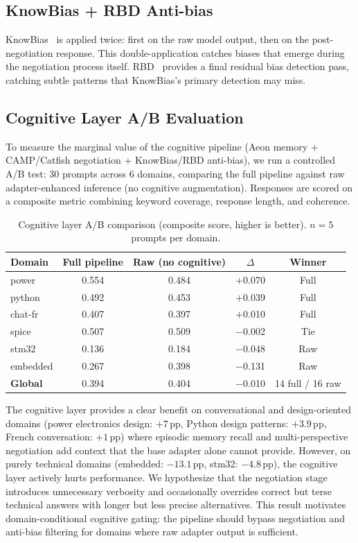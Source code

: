 \documentclass[11pt,a4paper]{article}
\begin{document}
\subsection{KnowBias + RBD Anti-bias}

KnowBias~\citep{knowbias2025} is applied twice: first on the raw model output, then on the post-negotiation response. This double-application catches biases that emerge during the negotiation process itself. RBD~\citep{rbd2025} provides a final residual bias detection pass, catching subtle patterns that KnowBias's primary detection may miss.

\subsection{Cognitive Layer A/B Evaluation}

To measure the marginal value of the cognitive pipeline (Aeon memory + CAMP/Catfish negotiation + KnowBias/RBD anti-bias), we run a controlled A/B test: 30 prompts across 6 domains, comparing the full pipeline against raw adapter-enhanced inference (no cognitive augmentation). Responses are scored on a composite metric combining keyword coverage, response length, and coherence.

\begin{table}[h]
\centering
\caption{Cognitive layer A/B comparison (composite score, higher is better). $n{=}5$ prompts per domain.}
\label{tab:cognitive-ab}
\begin{tabular}{lcccc}
\toprule
\textbf{Domain} & \textbf{Full pipeline} & \textbf{Raw (no cognitive)} & \textbf{$\Delta$} & \textbf{Winner} \\
\midrule
power & 0.554 & 0.484 & $+$0.070 & Full \\
python & 0.492 & 0.453 & $+$0.039 & Full \\
chat-fr & 0.407 & 0.397 & $+$0.010 & Full \\
spice & 0.507 & 0.509 & $-$0.002 & Tie \\
stm32 & 0.136 & 0.184 & $-$0.048 & Raw \\
embedded & 0.267 & 0.398 & $-$0.131 & Raw \\
\midrule
\textbf{Global} & 0.394 & 0.404 & $-$0.010 & 14 full / 16 raw \\
\bottomrule
\end{tabular}
\end{table}

The cognitive layer provides a clear benefit on conversational and design-oriented domains (power electronics design: $+7$\,pp, Python design patterns: $+3.9$\,pp, French conversation: $+1$\,pp) where episodic memory recall and multi-perspective negotiation add context that the base adapter alone cannot provide. However, on purely technical domains (embedded: $-13.1$\,pp, stm32: $-4.8$\,pp), the cognitive layer actively hurts performance. We hypothesize that the negotiation stage introduces unnecessary verbosity and occasionally overrides correct but terse technical answers with longer but less precise alternatives. This result motivates domain-conditional cognitive gating: the pipeline should bypass negotiation and anti-bias filtering for domains where raw adapter output is sufficient.
\end{document}
